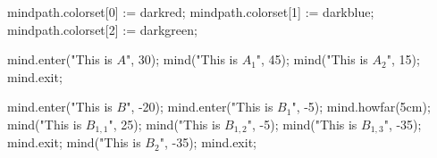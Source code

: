 \usemodule[mindmap]
\startMPpage
mindpath.colorset[0] := darkred;
mindpath.colorset[1] := darkblue;
mindpath.colorset[2] := darkgreen;

mind.enter("This is $A$", 30);
    mind("This is $A_1$", 45);
    mind("This is $A_2$", 15);
mind.exit;

mind.enter("This is $B$", -20);
    mind.enter("This is $B_{1}$", -5);
        mind.howfar(5cm);
        mind("This is $B_{1,1}$", 25);
        mind("This is $B_{1,2}$", -5);
        mind("This is $B_{1,3}$", -35);
    mind.exit;
    mind("This is $B_2$", -35);
mind.exit;
\stopMPpage
